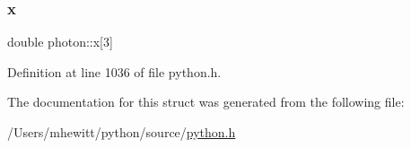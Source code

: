 \subsubsection{\texorpdfstring{x}{x}}
{\footnotesize\ttfamily double photon\+::x\mbox{[}3\mbox{]}}



Definition at line 1036 of file python.\+h.



The documentation for this struct was generated from the following file\+:\begin{DoxyCompactItemize}
\item 
/\+Users/mhewitt/python/source/\hyperlink{python_8h}{python.\+h}\end{DoxyCompactItemize}
